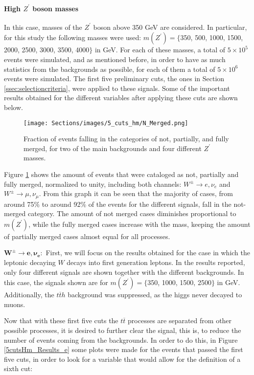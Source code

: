 \paragraph{High $Z^{\prime}$ boson masses}\label{ssec:highmass}

In this case, masses of the $Z^{\prime}$ boson above 350 GeV are considered. In particular, for this study the following masses were used: $m(Z^{\prime}) = \{$350, 500, 1000, 1500, 2000, 2500, 3000, 3500, 4000$\}$ in GeV. For each of these masses, a total of $5\times10^{5}$ events were simulated, and as mentioned before, in order to have as much statistics from the backgrounds as possible, for each of them a total of $5\times10^6$ events were simulated. The first five preliminary cuts, the ones in Section \ref{ssec:selectioncriteria}, were applied to these signals. Some of the important results obtained for the different variables after applying these cuts are shown below.

\begin{figure}[ht]
    \centering
    \texttt{[image: Sections/images/5\_cuts\_hm/N\_Merged.png]}
    \caption{Fraction of events falling in the categories of not, partially, and fully merged, for two of the main backgrounds and four different $Z^{\prime}$ masses.}
    \label{5cutsHm_Merged}
\end{figure}

Figure \ref{5cutsHm_Merged} shows the amount of events that were cataloged as not, partially and fully merged, normalized to unity, including both channels: $W^{\pm}\rightarrow e, \nu_e$ and $W^{\pm}\rightarrow \mu, \nu_{\mu}$. From this graph it can be seen that the majority of cases, from around 75\% to around 92\% of the events for the different signals, fall in the not-merged category.
The amount of not merged cases diminishes proportional to $m(Z^{\prime})$, while the fully merged cases increase with the mass, keeping the amount of partially merged cases almost equal for all processes.

$\bm{W^{\pm} \rightarrow e, \nu_e:}$ First, we will focus on the results obtained for the case in which the leptonic decaying $W$ decays into first generation leptons. In the results reported, only four different signals are shown together with the different backgrounds. In this case, the signals shown are for $m(Z^{\prime}) = \{$350, 1000, 1500, 2500$\}$ in GeV. Additionally, the $t\overline th$ background was suppressed, as the higgs never decayed to muons.

Now that with these first five cuts the $t\overline t$ processes are separated from other possible processes, it is desired to further clear the signal, this is, to reduce the number of events coming from the backgrounds. In order to do this, in Figure \ref{5cutsHm_Results_e} some plots were made for the events that passed the first five cuts, in order to look for a variable that would allow for the definition of a sixth cut:


